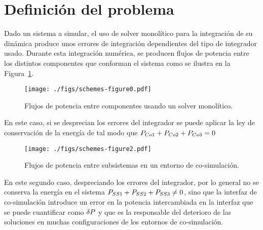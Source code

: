 


\section{Definición del problema}
\label{ch:definicion}





Dado un sistema a simular, el uso de solver monolítico para la integración de su dinámica produce unos errores de integración dependientes del tipo de integrador usado. Durante esta integración numérica, se producen flujos de potencia entre los distintos componentes que conforman el sistema como se ilustra en la Figura~\ref{fig:mono}.

\begin{figure}[ht!]\centering
	\texttt{[image: ./figs/schemes-figure0.pdf]}
	\caption{Flujos de potencia entre componentes usando un solver monolítico.}
	\label{fig:mono}
\end{figure}

En este caso, si se desprecian los errores del integrador se puede aplicar la ley de conservación de la energía de tal modo que $P_{Co1} + P_{Co2} + P_{Co3} = 0$

\begin{figure}[ht!]\centering
	\texttt{[image: ./figs/schemes-figure2.pdf]}
	\caption{Flujos de potencia entre subsistemas en un entorno de co-simulación.}
	\label{fig:cosim}
\end{figure}


En este segundo caso, despreciando los errores del integrador, por lo general no se conserva la energía en el sistema $P_{SS1} + P_{SS2} + P_{SS3} \neq 0$, sino que la interfaz de co-simulación introduce un error en la potencia intercambiada en la interfaz que se puede cuantificar como $\delta P$ y que es la responsable del deterioro de las soluciones en muchas configuraciones de los entornos de co-simulación.

